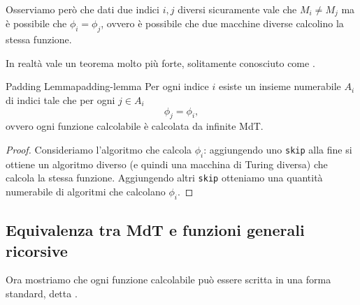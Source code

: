 Osserviamo però che dati due indici $i, j$ diversi sicuramente vale che $M_i \neq M_j$ ma è possibile che $\phi_i = \phi_j$, ovvero è possibile che due macchine diverse calcolino la stessa funzione.

In realtà vale un teorema molto più forte, solitamente conosciuto come .

\begin{theorem}
    {Padding Lemma}{padding-lemma}
    Per ogni indice $i$ esiste un insieme numerabile $A_i$ di indici tale che per ogni $j \in A_i$ \[
        \phi_j = \phi_i,
    \] ovvero ogni funzione calcolabile è calcolata da infinite MdT.
\end{theorem}
\begin{proof}
    Consideriamo l'algoritmo che calcola $\phi_i$: aggiungendo uno \texttt{skip} alla fine si ottiene un algoritmo diverso (e quindi una macchina di Turing diversa) che calcola la stessa funzione. Aggiungendo altri \texttt{skip} otteniamo una quantità numerabile di algoritmi che calcolano $\phi_i$.  
\end{proof}

\subsection{Equivalenza tra MdT e funzioni generali ricorsive}

Ora mostriamo che ogni funzione calcolabile può essere scritta in una forma standard, detta .

